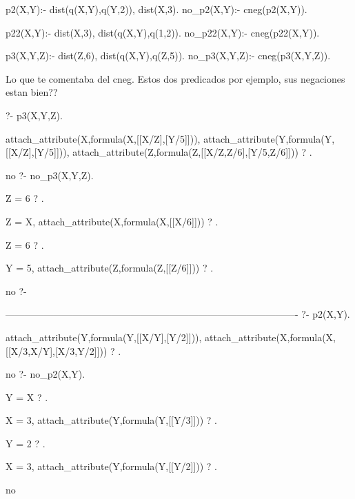p2(X,Y):- 
	dist(q(X,Y),q(Y,2)),  
	dist(X,3).    
no_p2(X,Y):- cneg(p2(X,Y)).

p22(X,Y):- 
	dist(X,3),    
	dist(q(X,Y),q(1,2)).  
no_p22(X,Y):- cneg(p22(X,Y)).

p3(X,Y,Z):-
	dist(Z,6),
	dist(q(X,Y),q(Z,5)).
no_p3(X,Y,Z):- cneg(p3(X,Y,Z)).





Lo que te comentaba del cneg. Estos dos predicados por ejemplo, sus negaciones estan bien??


?- p3(X,Y,Z).

attach_attribute(X,formula(X,[[X/Z],[Y/5]])),
attach_attribute(Y,formula(Y,[[X/Z],[Y/5]])),
attach_attribute(Z,formula(Z,[[X/Z,Z/6],[Y/5,Z/6]])) ? .

no
?- no_p3(X,Y,Z).

Z = 6 ? .

Z = X,
attach_attribute(X,formula(X,[[X/6]])) ? .

Z = 6 ? .

Y = 5,
attach_attribute(Z,formula(Z,[[Z/6]])) ? .

no
?-


-------------------------------------------------------------------------------------------
?- p2(X,Y).

attach_attribute(Y,formula(Y,[[X/Y],[Y/2]])),
attach_attribute(X,formula(X,[[X/3,X/Y],[X/3,Y/2]])) ? .

no
?- no_p2(X,Y).

Y = X ? .

X = 3,
attach_attribute(Y,formula(Y,[[Y/3]])) ? .

Y = 2 ? .

X = 3,
attach_attribute(Y,formula(Y,[[Y/2]])) ? .

no